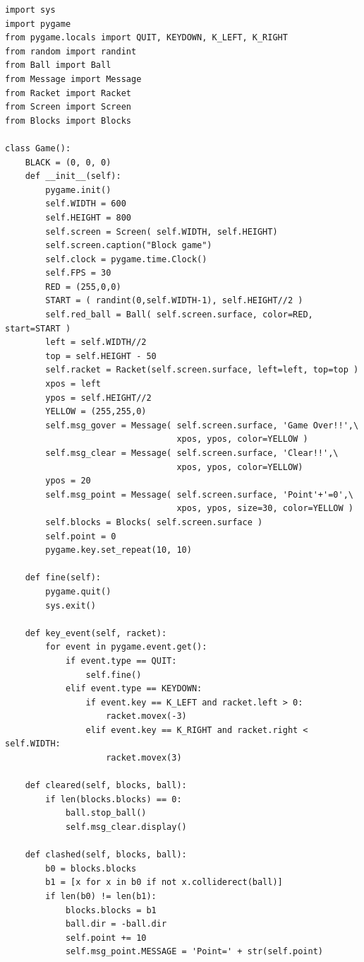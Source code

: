 \documentclass[uplatex,a4paper,11pt,oneside,openany]{jsbook}
\begin{document}
\begin{lstlisting}[caption=Gameクラス（blocksオブジェクトを追加）,label=p1]
import sys
import pygame
from pygame.locals import QUIT, KEYDOWN, K_LEFT, K_RIGHT
from random import randint
from Ball import Ball
from Message import Message
from Racket import Racket
from Screen import Screen
from Blocks import Blocks

class Game():
    BLACK = (0, 0, 0)
    def __init__(self):
        pygame.init()
        self.WIDTH = 600
        self.HEIGHT = 800
        self.screen = Screen( self.WIDTH, self.HEIGHT)
        self.screen.caption("Block game")
        self.clock = pygame.time.Clock()
        self.FPS = 30
        RED = (255,0,0)
        START = ( randint(0,self.WIDTH-1), self.HEIGHT//2 )
        self.red_ball = Ball( self.screen.surface, color=RED, start=START )
        left = self.WIDTH//2
        top = self.HEIGHT - 50
        self.racket = Racket(self.screen.surface, left=left, top=top )
        xpos = left
        ypos = self.HEIGHT//2
        YELLOW = (255,255,0)
        self.msg_gover = Message( self.screen.surface, 'Game Over!!',\
                                  xpos, ypos, color=YELLOW )
        self.msg_clear = Message( self.screen.surface, 'Clear!!',\
                                  xpos, ypos, color=YELLOW)
        ypos = 20
        self.msg_point = Message( self.screen.surface, 'Point'+'=0',\
                                  xpos, ypos, size=30, color=YELLOW )
        self.blocks = Blocks( self.screen.surface )
        self.point = 0
        pygame.key.set_repeat(10, 10)

    def fine(self):
        pygame.quit()
        sys.exit()

    def key_event(self, racket):
        for event in pygame.event.get():
            if event.type == QUIT:
                self.fine()
            elif event.type == KEYDOWN:
                if event.key == K_LEFT and racket.left > 0:
                    racket.movex(-3)
                elif event.key == K_RIGHT and racket.right < self.WIDTH:
                    racket.movex(3)

    def cleared(self, blocks, ball):
        if len(blocks.blocks) == 0:
            ball.stop_ball()
            self.msg_clear.display()

    def clashed(self, blocks, ball):
        b0 = blocks.blocks
        b1 = [x for x in b0 if not x.colliderect(ball)]
        if len(b0) != len(b1):
            blocks.blocks = b1
            ball.dir = -ball.dir
            self.point += 10
            self.msg_point.MESSAGE = 'Point=' + str(self.point)


\end{lstlisting}
\end{document}
